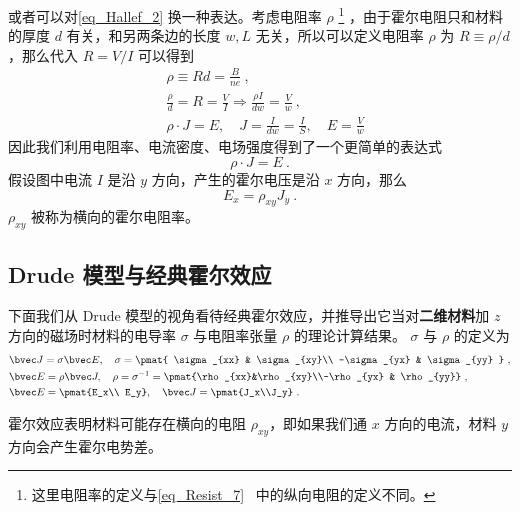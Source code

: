 或者可以对\autoref{eq_Hallef_2} 换一种表达。考虑电阻率 $\rho$
\footnote{这里电阻率的定义与\autoref{eq_Resist_7}~ 中的纵向电阻的定义不同。} ，由于霍尔电阻只和材料的厚度 $d$ 有关，和另两条边的长度 $w,L$ 无关，所以可以定义电阻率 $\rho$ 为 $R\equiv\rho /d$，那么代入 $R=V/I$ 可以得到
\begin{equation}
\begin{aligned}
&\rho\equiv Rd=\frac{B}{ne}~,\\
&\frac{\rho }{d} =R= \frac{V}{I}\Rightarrow \frac{\rho I}{dw}=\frac{V}{w}~,\\
&\rho \cdot J = E,\quad J= \frac{I}{dw}=\frac{I}{S},\quad E=\frac{V}{w}
\end{aligned}
\end{equation}
因此我们利用电阻率、电流密度、电场强度得到了一个更简单的表达式
\begin{equation}
\rho\cdot J=E~.
\end{equation}
假设图中电流 $I$ 是沿 $y$ 方向，产生的霍尔电压是沿 $x$ 方向，那么
\begin{equation}
E_x = \rho_{xy} J_y~.
\end{equation}
$\rho_{xy}$ 被称为横向的霍尔电阻率。

\subsection{Drude 模型与经典霍尔效应}
下面我们从 Drude 模型的视角看待经典霍尔效应，并推导出它当对\textbf{二维材料}加 $z$ 方向的磁场时材料的电导率 $\sigma$ 与电阻率张量 $\rho$ 的理论计算结果。 $\sigma$ 与 $\rho$ 的定义为
\begin{equation}
\begin{aligned}
&\bvec J=\sigma \bvec E,\quad \sigma=\pmat{
    \sigma_{xx} & \sigma_{xy}\\
    -\sigma_{yx} & \sigma_{yy}
}
~,\\
&\bvec E=\rho \bvec J,\quad \rho = \sigma^{-1} =
\pmat{\rho_{xx}&\rho_{xy}\\-\rho_{yx} & \rho_{yy}}~,\\
&\bvec E=\pmat{E_x\\ E_y},\quad \bvec J = \pmat{J_x\\J_y}~.
\end{aligned}
\end{equation}

霍尔效应表明材料可能存在横向的电阻 $\rho_{xy}$，即如果我们通 $x$ 方向的电流，材料 $y$ 方向会产生霍尔电势差。

